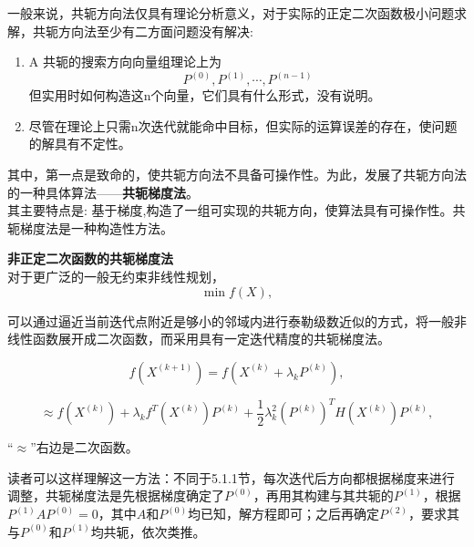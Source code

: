 一般来说，共轭方向法仅具有理论分析意义，对于实际的正定二次函数极小问题求解，共轭方向法至少有二方面问题没有解决:
\begin{enumerate}
    \item A 共轭的搜索方向向量组理论上为\[
    P^{(0)}, P^{(1)}, \cdots, P^{(n-1)}
    \]
    但实用时如何构造这n个向量，它们具有什么形式，没有说明。
    \item 尽管在理论上只需n次迭代就能命中目标，但实际的运算误差的存在，使问题的解具有不定性。
\end{enumerate}
其中，第一点是致命的，使共轭方向法不具备可操作性。为此，发展了共轭方向法的一种具体算法——\textbf{共轭梯度法}。
\\其主要特点是: 基于梯度,构造了一组可实现的共轭方向，使算法具有可操作性。共轭梯度法是一种构造性方法。

\begin{notebox}{\textbf{非正定二次函数的共轭梯度法}}{}
    \\对于更广泛的一般无约束非线性规划，
    \[
    \min f(X),
    \]

    \noindent 可以通过逼近当前迭代点附近是够小的邻域内进行泰勒级数近似的方式，将一般非线性函数展开成二次函数，而采用具有一定迭代精度的共轭梯度法。

    \[
    f(X^{(k+1)}) = f(X^{(k)} + \lambda_k P^{(k)}),
    \]

    \[
    \approx f(X^{(k)}) + \lambda_k f^T(X^{(k)}) P^{(k)} + \frac{1}{2} \lambda_k^2 (P^{(k)})^T H(X^{(k)}) P^{(k)},
    \]

    \noindent “$\approx$”右边是二次函数。
\end{notebox}
读者可以这样理解这一方法：不同于5.1.1节，每次迭代后方向都根据梯度来进行调整，共轭梯度法是先根据梯度确定了$P^{(0)}$，再用其构建与其共轭的$P^{(1)}$，根据$P^{(1)}AP^{(0)}=0$，其中$A$和$P^{(0)}$均已知，解方程即可；之后再确定$P^{(2)}$，要求其与$P^{(0)}$和$P^{(1)}$均共轭，依次类推。\\


